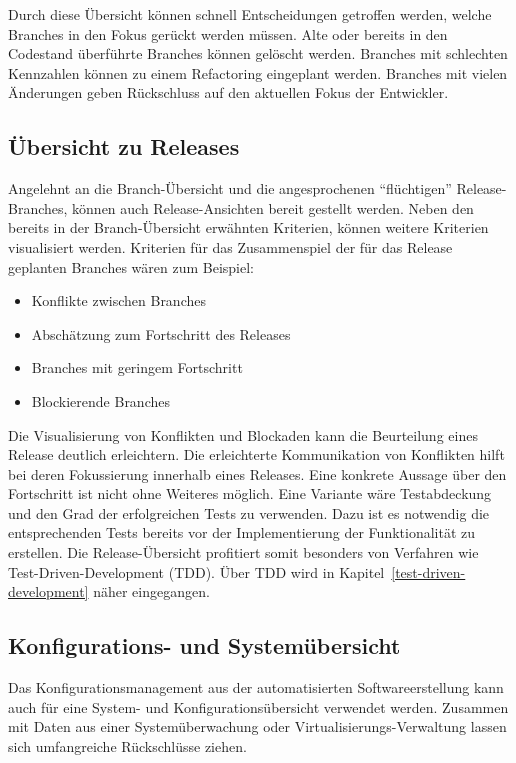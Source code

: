 Durch diese Übersicht können schnell Entscheidungen getroffen werden, welche Branches in den Fokus gerückt werden müssen. Alte oder bereits in den Codestand überführte Branches können gelöscht werden. Branches mit schlechten Kennzahlen können zu einem Refactoring eingeplant werden. Branches mit vielen Änderungen geben Rückschluss auf den aktuellen Fokus der Entwickler. 

\subsection{Übersicht zu Releases}

Angelehnt an die Branch-Übersicht und die angesprochenen ``flüchtigen'' Release-Branches, können auch Release-Ansichten bereit gestellt werden. Neben den bereits in der Branch-Übersicht erwähnten Kriterien, können weitere Kriterien visualisiert werden. Kriterien für das Zusammenspiel der für das Release geplanten Branches wären zum Beispiel:
\begin{itemize}
\item Konflikte zwischen Branches
\item Abschätzung zum Fortschritt des Releases
\item Branches mit geringem Fortschritt
\item Blockierende Branches
\end{itemize}

Die Visualisierung von Konflikten und Blockaden kann die Beurteilung eines Release deutlich erleichtern. Die erleichterte Kommunikation von Konflikten hilft bei deren Fokussierung innerhalb eines Releases. Eine konkrete Aussage über den Fortschritt ist nicht ohne Weiteres möglich. Eine Variante wäre Testabdeckung und den Grad der erfolgreichen Tests zu verwenden. Dazu ist es notwendig die entsprechenden Tests bereits vor der Implementierung der Funktionalität zu erstellen. Die Release-Übersicht profitiert somit besonders von Verfahren wie Test-Driven-Development (TDD). Über TDD wird in Kapitel~\ref{test-driven-development} näher eingegangen.

\subsection{Konfigurations- und Systemübersicht}
\label{subsubsec:configuration-system-overview}

Das Konfigurationsmanagement aus der automatisierten Softwareerstellung kann auch für eine System- und Konfigurationsübersicht verwendet werden. Zusammen mit Daten aus einer Systemüberwachung oder Virtualisierungs-Verwaltung lassen sich umfangreiche Rückschlüsse ziehen. 

